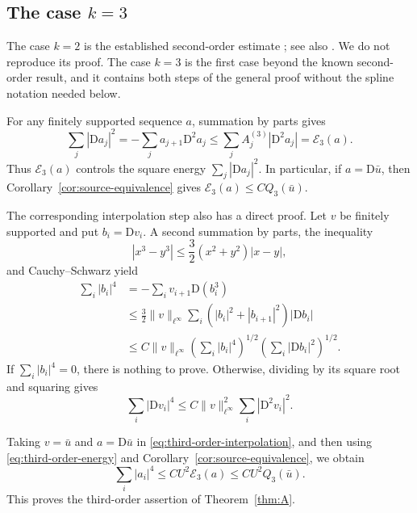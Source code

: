 \documentclass[11pt]{amsart}
\theoremstyle{plain}
\theoremstyle{definition}
\theoremstyle{remark}
\numberwithin{equation}{section}
\theoremstyle{plain}
\begin{document}
\subsection{The case \texorpdfstring{$k=3$}{k=3}}
\label{sec:odd-k3}

The case $k=2$ is the established second-order estimate
\cite[(2.16)]{CFM2AN}; see also
\cite[Section~4.4]{FjordholmHandbook}.  We do not reproduce its proof.
The case $k=3$ is the first case beyond the known second-order result, and it
contains both steps of the general proof without the spline notation
needed below.

For any finitely supported sequence $a$, summation by parts gives
\begin{equation}\label{eq:third-order-energy}
	\sum_j|\mathrm Da_j|^2
	=-\sum_j a_{j+1}\mathrm D^2a_j
	\le\sum_j A_j^{(3)}|\mathrm D^2a_j|
	=\mathcal E_3(a).
\end{equation}
Thus $\mathcal E_3(a)$ controls the square energy
$\sum_j|\mathrm Da_j|^2$.  In particular, if $a=\mathrm D\bar u$, then
Corollary~\ref{cor:source-equivalence} gives
$\mathcal E_3(a)\le C Q_3(\bar u)$.

The corresponding interpolation step also has a direct proof.  Let $v$ be
finitely supported and put $b_i=\mathrm Dv_i$.  A second summation by parts,
the inequality
\[
|x^3-y^3|
\le\frac32(x^2+y^2)|x-y|,
\]
and Cauchy--Schwarz yield
\begin{align*}
	\sum_i|b_i|^4
	&=-\sum_i v_{i+1}\mathrm D(b_i^3)\\
	&\le\frac32\|v\|_{\ell^\infty}
	\sum_i(|b_i|^2+|b_{i+1}|^2)|\mathrm Db_i|\\
	&\le C\|v\|_{\ell^\infty}
	\left(\sum_i|b_i|^4\right)^{1/2}
	\left(\sum_i|\mathrm Db_i|^2\right)^{1/2}.
\end{align*}
If $\sum_i|b_i|^4=0$, there is nothing to prove.  Otherwise, dividing by
its square root and squaring gives
\begin{equation}\label{eq:third-order-interpolation}
	\sum_i|\mathrm Dv_i|^4
	\le C\|v\|_{\ell^\infty}^2
	\sum_i|\mathrm D^2v_i|^2.
\end{equation}

Taking $v=\bar u$ and $a=\mathrm D\bar u$ in
\eqref{eq:third-order-interpolation}, and then using
\eqref{eq:third-order-energy} and Corollary~\ref{cor:source-equivalence}, we
obtain
\begin{equation}\label{eq:third-order-coercivity}
	\sum_i|a_i|^4
	\le C U^2\mathcal E_3(a)
	\le C U^2Q_3(\bar u).
\end{equation}
This proves the third-order assertion of Theorem~\ref{thm:A}.
\end{document}

